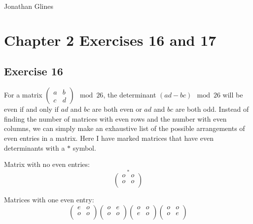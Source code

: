 \documentclass[12pt]{article}
\begin{document}
\begin{flushright}
\Large{Jonathan Glines}
\end{flushright}
\section*{Chapter 2 Exercises 16 and 17}
\subsection*{Exercise 16}
For a matrix $\left(\begin{matrix} a & b \\ c & d\end{matrix}\right) \mod 26$, the determinant $\left(ad - bc\right) \mod 26$ will be even if and only if $ad$ and $bc$ are both even or $ad$ and $bc$ are both odd. Instead of finding the number of matrices with even rows and the number with even columns, we can simply make an exhaustive list of the possible arrangements of even entries in a matrix. Here I have marked matrices that have even determinants with a $*$ symbol.

Matrix with no even entries:
\[
\stackrel{*}
{
\left(\begin{matrix}
o & o \\
o & o \\
\end{matrix}\right)
}
\]

Matrices with one even entry:
\[
\left(\begin{matrix}
e & o \\
o & o \\
\end{matrix}\right)
\left(\begin{matrix}
o & e \\
o & o \\
\end{matrix}\right)
\left(\begin{matrix}
o & o \\
e & o \\
\end{matrix}\right)
\left(\begin{matrix}
o & o \\
o & e \\
\end{matrix}\right)
\]
\end{document}
